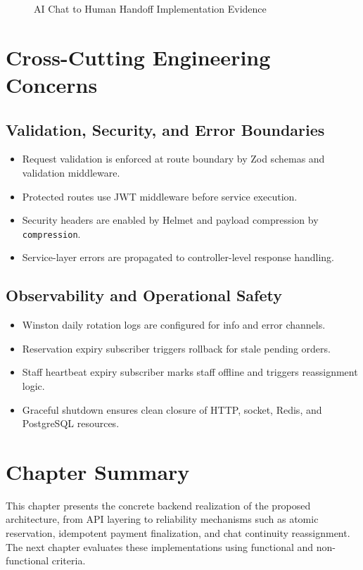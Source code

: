 \begin{figure}[H]
\centering
{}
\caption{AI Chat to Human Handoff Implementation Evidence}
\label{fig:impl-chat-handoff-evidence}
\end{figure}

\section{Cross-Cutting Engineering Concerns}

\subsection{Validation, Security, and Error Boundaries}

\begin{itemize}
    \item Request validation is enforced at route boundary by Zod schemas and validation middleware.
    \item Protected routes use JWT middleware before service execution.
    \item Security headers are enabled by Helmet and payload compression by \texttt{compression}.
    \item Service-layer errors are propagated to controller-level response handling.
\end{itemize}

\subsection{Observability and Operational Safety}

\begin{itemize}
    \item Winston daily rotation logs are configured for info and error channels.
    \item Reservation expiry subscriber triggers rollback for stale pending orders.
    \item Staff heartbeat expiry subscriber marks staff offline and triggers reassignment logic.
    \item Graceful shutdown ensures clean closure of HTTP, socket, Redis, and PostgreSQL resources.
\end{itemize}

\section{Chapter Summary}

This chapter presents the concrete backend realization of the proposed architecture, from API layering to reliability mechanisms such as atomic reservation, idempotent payment finalization, and chat continuity reassignment. The next chapter evaluates these implementations using functional and non-functional criteria.

